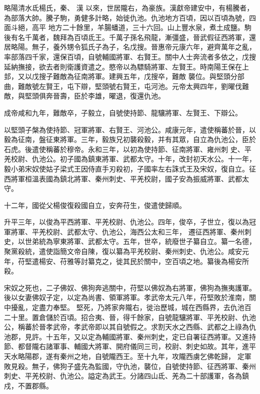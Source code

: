 
\begin{pinyinscope}

 略陽清水氐楊氏，秦、
 漢
 以來，世居隴右，為豪族。漢獻帝建安中，有楊騰者，為部落大帥。騰子駒，勇健多計略，始徙仇池。仇池地方百頃，因以百頃為號，四面斗絕，高平
 地方二十餘里，羊腸蟠道，三十六回。山上豐水泉，煮土成鹽。駒後有名千萬者，魏拜為百頃氐王。千萬子孫名飛龍，漸彊盛，晉武假征西將軍，還居略陽。無子，養外甥令狐氏子為子，名戊搜。晉惠帝元康六年，避齊萬年之亂，率部落四千家，還保百頃，自號輔國將軍、右賢王。關中人士奔流者多依之，戊搜延納撫接，欲去者則衛護資遣之。愍帝以為驃騎將軍、左賢王。時南陽王保在上邽，又以戊搜子難敵為征南將軍。建興五年，戊搜卒，難敵
 襲位。與堅頭分部曲，難敵號左賢王，屯下辯，堅頭號右賢王，屯河池。元帝太興四年，劉曜伐難敵，與堅頭俱奔晉壽，臣於李雄，曜退，復還仇池。



 成帝咸和九年，難敵卒，子毅立，自號使持節、龍驤將軍、左賢王、下辯公。



 以堅頭子槃為使持節、冠軍將軍、右賢王、河池公。咸康元年，遣使稱蕃於晉，以毅為征南，盤征東將軍。三年，毅族兄初襲殺毅，并有其眾，自立為仇池公，臣於石虎。後遣使稱蕃於穆帝。永和三年，以初為使持節、征南將軍、雍州刺
 史、平羌校尉、仇池公。初子國為鎮東將軍、武都太守。十年，改封初天水公。十一年，毅小弟宋奴使姑子梁式王因侍直手刃殺初，子國率左右誅式王及宋奴，復自立。征西將軍桓溫表國為鎮北將軍、秦州刺史、平羌校尉，國子安為振威將軍、武都太守。



 十二年，國從父楊俊復殺國自立，安奔苻生，俊遣使歸順。



 升平三年，以俊為平西將軍、平羌校尉、仇池公。四年，俊卒，子世立，復以為冠軍將軍、平羌校尉、武都太守、仇池公，海西公太和三年，
 遷征西將軍、秦州刺史，以世弟統為寧東將軍、武都太守。五年，世卒，統廢世子纂自立。纂一名德，聚黨殺統，遣使詣簡文帝自陳，復以纂為平羌校尉、秦州刺史、仇池公。咸安元年，苻堅遣楊安、苻雅等討纂克之，徙其民於關中，空百頃之地。纂後為楊安所殺。



 宋奴之死也，二子佛奴、佛狗奔逃關中，苻堅以佛奴為右將軍，佛狗為撫夷護軍。後以女妻佛奴子定，以定為尚書、領軍將軍。孝武帝太元八年，苻堅敗於淮南，關中擾亂，定盡力奉堅。
 堅死，乃將家奔隴右，徙治歷城，城在西縣界，去仇池百二十里。置倉儲於百頃。招合夷、晉，得千餘家，自號龍驤將軍、平羌校尉、仇池公，稱蕃於晉孝武帝，孝武帝即以其自號假之。求割天水之西縣、武都之上祿為仇池郡，見許。十五年，又以定為輔國將軍、秦州刺史，定已自署征西將軍。又進持節、都督隴右諸軍事、輔國大將軍、開府儀同三司，校尉、刺史如故。其年，進平天水略陽郡，遂有秦州之地，自號隴西王。至十九年，攻隴西虜乞佛乾歸，
 定軍敗見殺。無子，佛狗子盛先為監國，守仇池，襲位，自號使持節、征西將軍、秦州刺史、平羌校尉、仇池公。謚定為武王。分諸四山氐、羌為二十部護軍，各為鎮戍，不置郡縣。




\end{pinyinscope}
